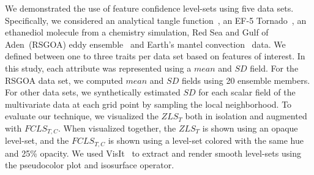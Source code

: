 %



%
We demonstrated the use of feature confidence level-sets using five data sets.
%
Specifically, we considered an analytical tangle function~\cite{knoll2009fast}, an EF-5 Tornado~\cite{atmos10100578}, an ethanediol molecule from a chemistry simulation, Red Sea and Gulf of Aden~(RSGOA) eddy ensemble~\cite{sanikommu2020impact} and Earth's mantel convection~\cite{shahnas2017mid} data.
%
We defined between one to three traits per data set based on features of interest. 
%
%
In this study, each attribute was represented using a $mean$ and $SD$ field. 
%
For the RSGOA data set, we computed $mean$ and $SD$ fields using 20 ensemble members. 
%
For other data sets, we synthetically estimated $SD$ for each scalar field of the multivariate data at each grid point by sampling the local neighborhood.
%
To evaluate our technique, we visualized the $ZLS_{T}$ both in isolation and augmented with $FCLS_{T,C}$. 
%
When visualized together, the $ZLS_{T}$ is shown using an opaque level-set, and the $FCLS_{T,C}$ is shown using a level-set colored with the same hue and 25\% opacity.
%
We used VisIt~\cite{childs2012visit} to extract and render smooth level-sets using the pseudocolor plot and isosurface operator.

%

